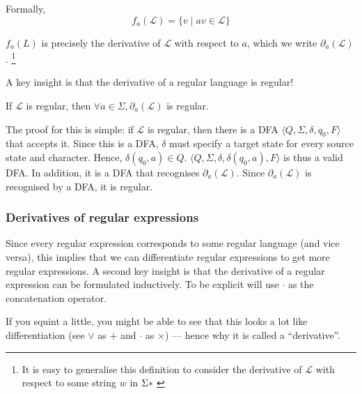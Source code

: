 Formally, \[f_a(\mathcal{L}) = \{ v \mid av \in \mathcal{L}\}\]

$f_a(L)$ is precisely the derivative of $\mathcal{L}$ with respect to $a$, which we write $\partial_a(\mathcal{L})$. \footnote{It is easy to generalise this definition to consider the derivative of $\mathcal{L}$ with respect to some string $w$ in $\Sigma\*$}

A key insight is that the derivative of a regular language is regular!

\begin{theorem}
    \label{thm:closure-differentiation}
    If $\mathcal{L}$ is regular, then $\forall a \in \Sigma, \partial_a(\mathcal{L})$ is regular.
\end{theorem}

The proof for this is simple: if $\mathcal{L}$ is regular, then there is a DFA $\langle Q, \Sigma, \delta, q_0, F \rangle$ that accepts it. Since this is a DFA, $\delta$ must specify a target state for every source state and character. Hence, $\delta(q_0, a) \in Q$. $\langle Q, \Sigma, \delta, \delta(q_0, a), F \rangle$ is thus a valid DFA. In addition, it is a DFA that recognises $\partial_a(\mathcal{L})$. Since $\partial_a(\mathcal{L})$ is recognised by a DFA, it is regular.

\subsubsection{Derivatives of regular expressions}
Since every regular expression corresponds to some regular language (and vice versa), this implies that we can differentiate regular expressions to get more regular expressions. A second key insight is that the derivative of a regular expression can be formulated inductively. To be explicit will use $\cdot$ as the concatenation operator. 

If you squint a little, you might be able to see that this looks a lot like differentiation (see $\lor$ as $+$ and $\cdot$ as $\times$) --- hence why it is called a ``derivative''.

